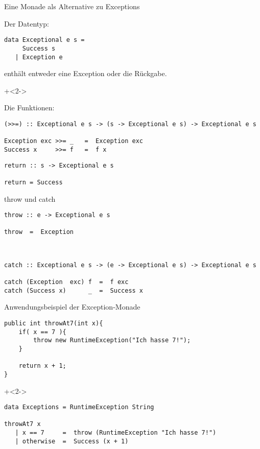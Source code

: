 \begin{frame}[fragile]{Eine Monade als Alternative zu Exceptions}

Der Datentyp:
\begin{lstlisting}
data Exceptional e s =
     Success s
   | Exception e
\end{lstlisting}

enthält entweder eine Exception oder die Rückgabe.

\onslide+<2->

Die Funktionen:
\begin{lstlisting}
(>>=) :: Exceptional e s -> (s -> Exceptional e s) -> Exceptional e s

Exception exc >>= _   =  Exception exc
Success x     >>= f   =  f x
\end{lstlisting}


\begin{lstlisting}
return :: s -> Exceptional e s

return = Success
\end{lstlisting}
\end{frame}

\begin{frame}[fragile]{throw und catch}
\begin{lstlisting}
throw :: e -> Exceptional e s

throw  =  Exception
\end{lstlisting}

~

\begin{lstlisting}
catch :: Exceptional e s -> (e -> Exceptional e s) -> Exceptional e s

catch (Exception  exc) f  =  f exc
catch (Success x)      _  =  Success x
\end{lstlisting}

\end{frame}


\begin{frame}[fragile]{Anwendungsbeispiel der Exception-Monade}
\begin{lstlisting}
public int throwAt7(int x){
    if( x == 7 ){
        throw new RuntimeException("Ich hasse 7!");
    }
    
    return x + 1;
}
\end{lstlisting}

\onslide+<2->

\begin{lstlisting}
data Exceptions = RuntimeException String

throwAt7 x
   | x == 7     =  throw (RuntimeException "Ich hasse 7!")
   | otherwise  =  Success (x + 1)
\end{lstlisting}


\end{frame}

